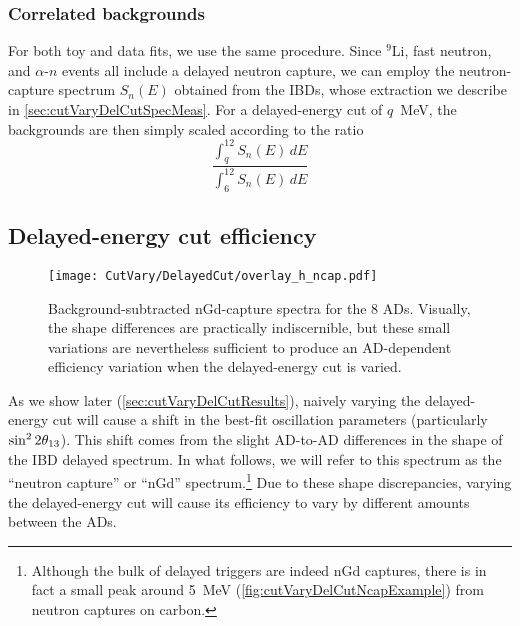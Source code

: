 \documentclass[../thesis.tex]{subfiles}
\begin{document}
\subsubsection{Correlated backgrounds}

For both toy and data fits, we use the same procedure. Since $^9$Li, fast neutron, and $\alpha$-$n$ events all include a delayed neutron capture, we can employ the neutron-capture spectrum $S_n(E)$ obtained from the IBDs, whose extraction we describe in \autoref{sec:cutVaryDelCutSpecMeas}. For a delayed-energy cut of $q$~MeV, the backgrounds are then simply scaled according to the ratio
\begin{equation}
  \label{eq:cutVaryDelCutCorrBkgScale}
  \frac{\int_q^{12} S_n(E)\,dE}{\int_6^{12} S_n(E)\,dE}
\end{equation}

\subsection{Delayed-energy cut efficiency}
\label{sec:cutVaryDelCutEff}

\begin{figure}[ht]
  \texttt{[image: CutVary/DelayedCut/overlay\_h\_ncap.pdf]}
  \caption{Background-subtracted nGd-capture spectra for the 8 ADs. Visually, the shape differences are practically indiscernible, but these small variations are nevertheless sufficient to produce an AD-dependent efficiency variation when the delayed-energy cut is varied.}
  \label{fig:cutVaryDelCutSpecOverlay}
\end{figure}

As we show later (\autoref{sec:cutVaryDelCutResults}), naively varying the delayed-energy cut will cause a shift in the best-fit oscillation parameters (particularly $\sin^2 2\theta_{13}$). This shift comes from the slight AD-to-AD differences in the shape of the IBD delayed spectrum. In what follows, we will refer to this spectrum as the ``neutron capture'' or ``nGd'' spectrum.\footnote{Although the bulk of delayed triggers are indeed nGd captures, there is in fact a small peak around 5~MeV (\autoref{fig:cutVaryDelCutNcapExample}) from neutron captures on carbon.} Due to these shape discrepancies, varying the delayed-energy cut will cause its efficiency to vary by different amounts between the ADs.
\end{document}
